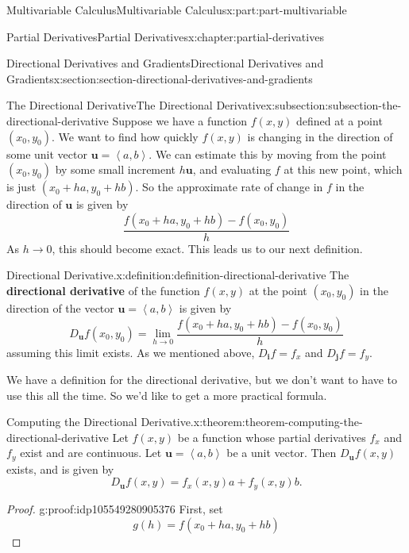 \documentclass[twoside,10pt,]{book}
\newcommand{\terminology}[1]{\textbf{#1}}
\numberwithin{equation}{part}
\newcommand{\vb}[1]{\mathbf{#1}}
\newcommand{\dotprod}[1]{\left\langle #1 \right\rangle}
\begin{document}
\begin{partptx}{Multivariable Calculus}{}{Multivariable Calculus}{}{}{x:part:part-multivariable}
\begin{chapterptx}{Partial Derivatives}{}{Partial Derivatives}{}{}{x:chapter:partial-derivatives}
\begin{sectionptx}{Directional Derivatives and Gradients}{}{Directional Derivatives and Gradients}{}{}{x:section:section-directional-derivatives-and-gradients}
%
\begin{subsectionptx}{The Directional Derivative}{}{The Directional Derivative}{}{}{x:subsection:subsection-the-directional-derivative}
Suppose we have a function \(f(x,y)\) defined at a point \((x_{0},y_{0})\). We want to find how quickly \(f(x,y)\) is changing in the direction of some unit vector \(\vb{u} = \dotprod{a,b}\). We can estimate this by moving from the point \((x_{0},y_{0})\) by some small increment \(h\vb{u}\), and evaluating \(f\) at this new point, which is just \((x_{0} + ha, y_{0} + hb)\). So the approximate rate of change in \(f\) in the direction of \(\vb{u}\) is given by%
\begin{equation*}
\frac{f(x_{0}+ha, y_{0} + hb) - f(x_{0},y_{0})}{h}
\end{equation*}
As \(h\to0\), this should become exact. This leads us to our next definition.%
\begin{definition}{Directional Derivative.}{x:definition:definition-directional-derivative}%
%
The \terminology{directional derivative} of the function \(f(x,y)\) at the point \((x_{0},y_{0})\) in the direction of the vector \(\vb{u} = \dotprod{a,b}\) is given by%
\begin{equation*}
D_{\vb{u}}f(x_{0},y_{0}) = \lim_{h\to0}\frac{f(x_{0}+ha, y_{0} + hb) - f(x_{0},y_{0})}{h}
\end{equation*}
assuming this limit exists. As we mentioned above, \(D_{\vb{i}}f = f_{x}\) and \(D_{\vb{j}}f = f_{y}\).%
\end{definition}
We have a definition for the directional derivative, but we don't want to have to use this all the time. So we'd like to get a more practical formula.%
\begin{theorem}{Computing the Directional Derivative.}{}{x:theorem:theorem-computing-the-directional-derivative}%
%
Let \(f(x,y)\) be a function whose partial derivatives \(f_{x}\) and \(f_{y}\) exist and are continuous. Let \(\vb{u} = \dotprod{a,b}\) be a unit vector. Then \(D_{\vb{u}}f(x,y)\) exists, and is given by%
\begin{equation*}
D_{\vb{u}}f(x,y) = f_{x}(x,y)a + f_{y}(x,y)b.
\end{equation*}
%
\end{theorem}
\begin{proof}{}{g:proof:idp105549280905376}
First, set%
\begin{equation*}
g(h) = f(x_{0}+ha, y_{0} +hb)
\end{equation*}

\end{proof}
\end{subsectionptx}
\end{sectionptx}
\end{chapterptx}
\end{partptx}
\end{document}
